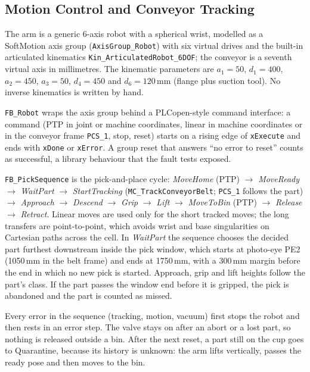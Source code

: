 \subsection{Motion Control and Conveyor Tracking}

The arm is a generic 6-axis robot with a spherical wrist, modelled as a SoftMotion axis group
(\texttt{AxisGroup\_Robot}) with six virtual drives and the built-in articulated kinematics
\texttt{Kin\_ArticulatedRobot\_6DOF}; the conveyor is a seventh virtual axis in millimetres. The
kinematic parameters are $a_1 = 50$, $d_1 = 400$, $a_2 = 450$, $a_3 = 50$, $d_4 = 450$ and
$d_6 = 120$\,mm (flange plus suction tool). No inverse kinematics is written by hand.

\texttt{FB\_Robot} wraps the axis group behind a PLCopen-style command interface: a command
(PTP in joint or machine coordinates, linear in machine coordinates or in the conveyor frame
\texttt{PCS\_1}, stop, reset) starts on a rising edge of \texttt{xExecute} and ends with
\texttt{xDone} or \texttt{xError}. A group reset that answers ``no error to reset'' counts as
successful, a library behaviour that the fault tests exposed.

\texttt{FB\_PickSequence} is the pick-and-place cycle: \emph{MoveHome} (PTP) $\rightarrow$
\emph{MoveReady} $\rightarrow$ \emph{WaitPart} $\rightarrow$ \emph{StartTracking}
(\texttt{MC\_TrackConveyorBelt}; \texttt{PCS\_1} follows the part) $\rightarrow$
\emph{Approach} $\rightarrow$ \emph{Descend} $\rightarrow$ \emph{Grip} $\rightarrow$
\emph{Lift} $\rightarrow$ \emph{MoveToBin} (PTP) $\rightarrow$ \emph{Release} $\rightarrow$
\emph{Retract}. Linear moves are used only for the short tracked moves; the long transfers are
point-to-point, which avoids wrist and base singularities on Cartesian paths across the cell. In
\emph{WaitPart} the sequence chooses the decided part furthest downstream inside the pick window,
which starts at photo-eye PE2 (1050\,mm in the belt frame) and ends at 1750\,mm, with a 300\,mm
margin before the end in which no new pick is started. Approach, grip and lift heights follow the
part's class. If the part passes the window end before it is gripped, the pick is abandoned and
the part is counted as missed.

Every error in the sequence (tracking, motion, vacuum) first stops the robot and then rests in
an error step. The valve stays on after an abort or a lost part, so nothing is released outside a
bin. After the next reset, a part still on the cup goes to Quarantine, because its history is
unknown: the arm lifts vertically, passes the ready pose and then moves to the bin.

